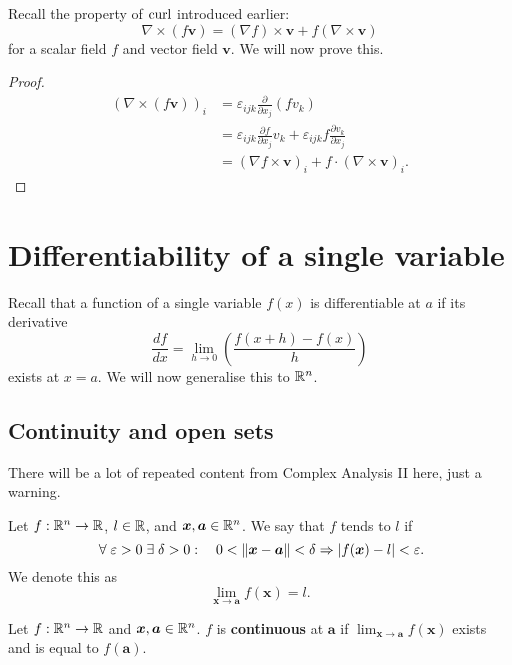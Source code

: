 
Recall the property of $\operatorname{curl}$ introduced earlier:
\[ \nabla \times (f\bm v) = (\nabla f) \times \bm v + f(\nabla \times \bm v) \]
for a scalar field $f$ and vector field $\bm v$. We will now prove this.

\begin{proof}
    \begin{align*}
        (\nabla \times (f\bm v))_i &= \varepsilon_{ijk} \frac{\partial}{\partial x_j}(fv_k) \\
        &= \varepsilon_{ijk} \frac{\partial f}{\partial x_j} v_k + \varepsilon_{ijk}f\frac{\partial v_k}{\partial x_j} \\
        &= (\nabla f \times \bm v)_i + f\cdot(\nabla \times \bm v)_i.
    \end{align*}
\end{proof}

\chapter{Differentiability of a single variable}

Recall that a function of a single variable $f(x)$ is differentiable at $a$ if its derivative
\[ \frac{df}{dx} = \lim_{h \to 0} \left(\frac{f(x + h) - f(x)}{h}\right) \]
exists at $x = a$. We will now generalise this to $\mathbb{R}^n$.

\section{Continuity and open sets}

There will be a lot of repeated content from Complex Analysis II here, just a warning.

\begin{definition}[Limit]
    Let $f: \mathbb{R}^n \to \mathbb{R}$, $l \in \mathbb{R}$, and $\bm x, \bm a \in \mathbb{R}^n$. We say that $f$ tends to $l$ if
    \[ \;\forall\; \varepsilon > 0 \;\exists\; \delta > 0 : \quad 0 < \left\lVert\bm x - \bm a\right\rVert < \delta \Rightarrow \lvert f(\bm x) - l \rvert < \varepsilon. \]
    We denote this as
    \[ \lim_{\bm x \to \bm a} f(\bm x) = l. \]
\end{definition}

\begin{definition}[Continuous]
    Let $f: \mathbb{R}^n \to \mathbb{R}$ and $\bm x, \bm a \in \mathbb{R}^n$. $f$ is \textbf{continuous} at $\bm a$ if
    $\lim_{\bm x \to \bm a} f(\bm x)$
    exists and is equal to $f(\bm a)$.
\end{definition}

